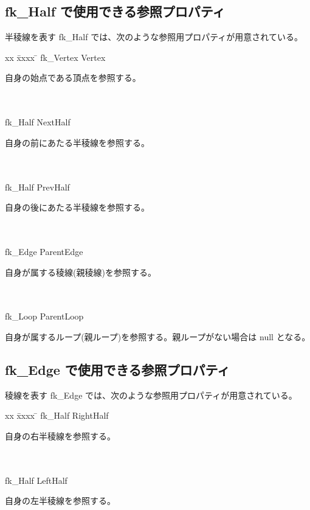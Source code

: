 \subsection{fk\_Half で使用できる参照プロパティ}
半稜線を表す fk\_Half では、次のような参照用プロパティが用意されている。
\begin{tabbing}
xx \= xxxx \= \kill
\> fk\_Vertex Vertex \\
	\> \> \begin{minipage}[]{15cm}
		自身の始点である頂点を参照する。
	\end{minipage} \\ \\

\> fk\_Half NextHalf \\
	\> \> \begin{minipage}[]{15cm}
		自身の前にあたる半稜線を参照する。
	\end{minipage} \\ \\

\> fk\_Half PrevHalf \\
	\> \> \begin{minipage}[]{15cm}
		自身の後にあたる半稜線を参照する。
	\end{minipage} \\ \\

\> fk\_Edge ParentEdge \\
	\> \> \begin{minipage}[]{15cm}
		自身が属する稜線(親稜線)を参照する。
	\end{minipage} \\ \\

\> fk\_Loop ParentLoop \\
	\> \> \begin{minipage}[]{15cm}
		自身が属するループ(親ループ)を参照する。親ループがない場合は null となる。
	\end{minipage}
\end{tabbing}

\subsection{fk\_Edge で使用できる参照プロパティ}
稜線を表す fk\_Edge では、次のような参照用プロパティが用意されている。
\begin{tabbing}
xx \= xxxx \= \kill
\> fk\_Half RightHalf \\
	\> \> \begin{minipage}[]{15cm}
		自身の右半稜線を参照する。
	\end{minipage} \\ \\

\> fk\_Half LeftHalf \\
	\> \> \begin{minipage}[]{15cm}
		自身の左半稜線を参照する。
	\end{minipage}
\end{tabbing}

